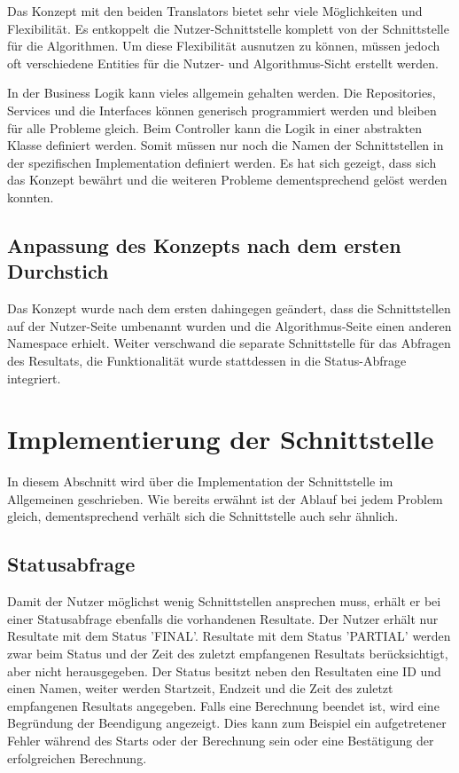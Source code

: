 Das Konzept mit den beiden Translators bietet sehr viele Möglichkeiten und Flexibilität. Es entkoppelt die Nutzer-Schnittstelle komplett von der Schnittstelle für die Algorithmen. Um diese 
Flexibilität ausnutzen zu können, müssen jedoch oft verschiedene Entities für die Nutzer- und Algorithmus-Sicht erstellt werden.

In der Business Logik kann vieles allgemein gehalten werden. Die Repositories, Services und die Interfaces können generisch programmiert werden und bleiben für alle Probleme gleich. Beim 
Controller kann die Logik in einer abstrakten Klasse definiert werden. Somit müssen nur noch die Namen der Schnittstellen in der spezifischen Implementation definiert werden. Es hat sich 
gezeigt, dass sich das Konzept bewährt und die weiteren Probleme dementsprechend gelöst werden konnten.

\subsection{Anpassung des Konzepts nach dem ersten Durchstich}\label{doings_prototyp}
Das Konzept wurde nach dem ersten  dahingegen geändert, dass die Schnittstellen auf der Nutzer-Seite umbenannt wurden und die 
Algorithmus-Seite einen anderen Namespace erhielt. Weiter verschwand die separate Schnittstelle für das Abfragen des Resultats, die Funktionalität wurde stattdessen in die Status-Abfrage 
integriert.

\section{Implementierung der Schnittstelle}\label{impl_interface}
In diesem Abschnitt wird über die Implementation der Schnittstelle im Allgemeinen geschrieben. Wie bereits erwähnt ist der Ablauf bei jedem Problem gleich, dementsprechend verhält sich die 
Schnittstelle auch sehr ähnlich.

\subsection{Statusabfrage}
Damit der Nutzer möglichst wenig Schnittstellen ansprechen muss, erhält er bei einer Statusabfrage ebenfalls die vorhandenen Resultate. Der Nutzer erhält nur Resultate mit dem Status 'FINAL'. 
Resultate mit dem Status 'PARTIAL' werden zwar beim Status und der Zeit des zuletzt empfangenen Resultats berücksichtigt, aber nicht herausgegeben. Der Status besitzt neben den 
Resultaten eine ID und einen Namen, weiter werden Startzeit, Endzeit und die Zeit des zuletzt empfangenen Resultats angegeben. Falls eine Berechnung beendet ist, wird eine 
Begründung der Beendigung angezeigt. Dies kann zum Beispiel ein aufgetretener Fehler während des Starts oder der Berechnung sein oder eine Bestätigung der erfolgreichen Berechnung.

